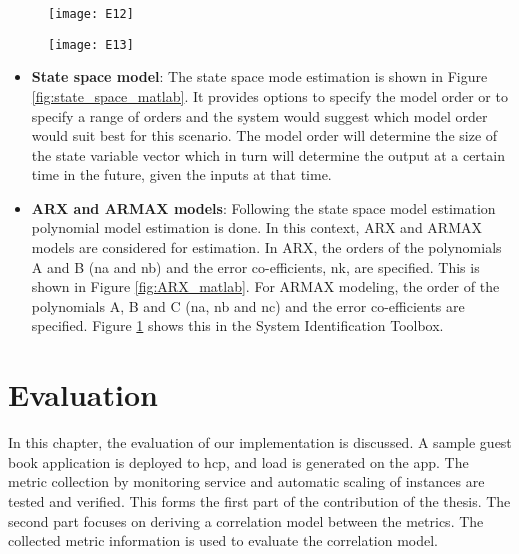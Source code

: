 \documentclass[article,type=msc,colorback,12pt,accentcolor=tud8b,table]{tudthesis}
\begin{document}
	\begin{figure}[H]
		\centering
		\begin{minipage}{.4\textwidth}
			\centering
			\texttt{[image: E12]}
			\label{fig:ARX_matlab}
			
		\end{minipage}%
		\begin{minipage}{.4\textwidth}
			\centering
			\texttt{[image: E13]}
			\label{fig:ARMAX_matlab}
		\end{minipage}
	\end{figure}

	\begin{itemize}
		\item{\textbf{State space model}:} The state space mode estimation is shown in Figure \ref{fig:state_space_matlab}. It provides options to specify the model order or to specify a range of orders and the system would suggest which model order would suit best for this scenario. The model order will determine the size of the state variable vector which in turn will determine the output at a certain time in the future, given the inputs at that time.
		
		\item{\textbf{ARX and ARMAX models}:} 	Following the state space model estimation polynomial model estimation is done. In this context, ARX and ARMAX models are considered for estimation. In ARX, the orders of the polynomials A and B (na and nb) and the error co-efficients, nk, are specified. This is shown in Figure \ref{fig:ARX_matlab}. For ARMAX modeling, the order of the polynomials A, B and C (na, nb and nc) and the error co-efficients are specified. Figure \ref{fig:ARMAX_matlab} shows this in the System Identification Toolbox.
		
	\end{itemize}
 
 \cleardoublepage
 
  \hfill 
 \section{Evaluation}
 \hfill \break
 
 In this chapter, the evaluation of our implementation is discussed. A sample guest book application is deployed to \gls{hcp}, and load is generated on the app. The metric collection by monitoring service and automatic scaling of instances are tested and verified. This forms the first part of the contribution of the thesis. The second part focuses on deriving a correlation model between the metrics. The collected metric information is used to evaluate the correlation model. 
\end{document}
